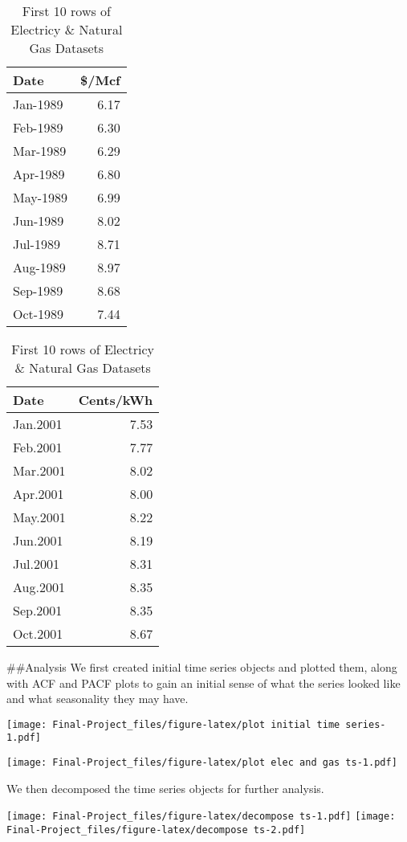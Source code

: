 \documentclass[
]{article}
\begin{document}
\begin{table}
\caption{\label{tab:unnamed-chunk-2}First 10 rows of Electricy & Natural Gas Datasets}

\begin{tabular}[t]{l|r}
\hline
Date & \$/Mcf\\
\hline
Jan-1989 & 6.17\\
\hline
Feb-1989 & 6.30\\
\hline
Mar-1989 & 6.29\\
\hline
Apr-1989 & 6.80\\
\hline
May-1989 & 6.99\\
\hline
Jun-1989 & 8.02\\
\hline
Jul-1989 & 8.71\\
\hline
Aug-1989 & 8.97\\
\hline
Sep-1989 & 8.68\\
\hline
Oct-1989 & 7.44\\
\hline
\end{tabular}
\begin{tabular}[t]{l|r}
\hline
Date & Cents/kWh\\
\hline
Jan.2001 & 7.53\\
\hline
Feb.2001 & 7.77\\
\hline
Mar.2001 & 8.02\\
\hline
Apr.2001 & 8.00\\
\hline
May.2001 & 8.22\\
\hline
Jun.2001 & 8.19\\
\hline
Jul.2001 & 8.31\\
\hline
Aug.2001 & 8.35\\
\hline
Sep.2001 & 8.35\\
\hline
Oct.2001 & 8.67\\
\hline
\end{tabular}
\end{table}

\#\#Analysis We first created initial time series objects and plotted
them, along with ACF and PACF plots to gain an initial sense of what the
series looked like and what seasonality they may have.

\texttt{[image: Final-Project\_files/figure-latex/plot initial time series-1.pdf]}

\texttt{[image: Final-Project\_files/figure-latex/plot elec and gas ts-1.pdf]}

We then decomposed the time series objects for further analysis.

\texttt{[image: Final-Project\_files/figure-latex/decompose ts-1.pdf]}
\texttt{[image: Final-Project\_files/figure-latex/decompose ts-2.pdf]}
\end{document}
